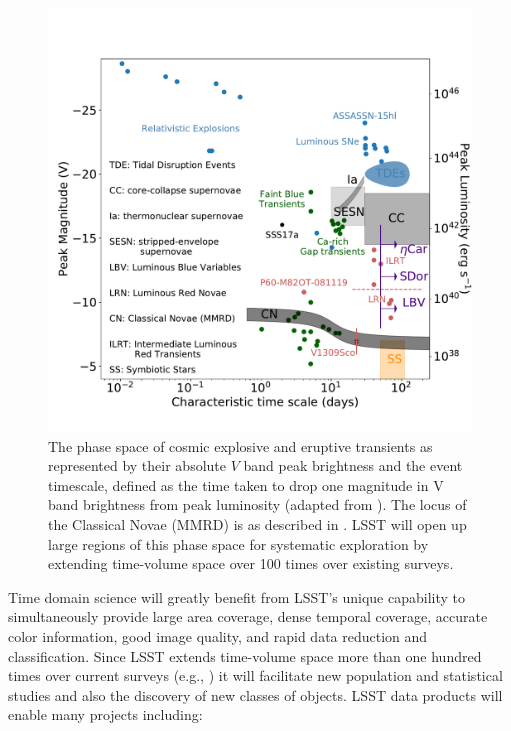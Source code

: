 \begin{figure}
\hskip -0.1in
\vskip -0.1in
\includegraphics[width=1.0\hsize,clip]{taumv_updated.pdf}
\caption{The phase space of cosmic explosive and eruptive transients
  as represented by their absolute $V$ band peak brightness and the
  event timescale, defined as the time taken to drop one magnitude in
  V band brightness from peak luminosity (adapted from \cite{Kulkarni2007}
  \cite{Kasliwal2011}).  The locus of the Classical
  Novae (MMRD) is as described in \cite{DellaValle1995}.  LSST
  will open up large regions of this phase space for systematic
  exploration by extending time-volume space over 100 times over
  existing surveys.}
\label{Fig:shri}
\end{figure}

Time domain science will greatly benefit from LSST's unique capability
to simultaneously provide large area coverage, dense temporal
coverage, accurate color information, good image quality, and rapid
data reduction and classification. Since LSST extends time-volume
space more than one hundred times over current surveys (e.g., \cite{Morokuma2008})
it will facilitate new population and statistical studies and also the discovery of new classes of
objects.  LSST data products will enable many projects including:

